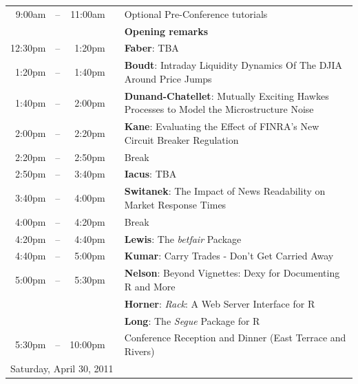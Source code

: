 \documentclass[11pt]{article}
\newcommand{\mylinecolor}[1]{\color{#1}\vspace{-8pt}}  %
\begin{document}
\begin{tabular}{rlrlp{5in}}
  9:00am & -- & 11:00am &   & \small{\mylinecolor{Breaks} Optional Pre-Conference tutorials} \\
  \phantom{X 12:00am}  & \phantom{m} &  & & \textbf{\color{Breaks} Opening remarks} \\
  12:30pm& -- & 1:20pm &    & \textbf{\color{KeynoteTalk} Faber}: \small{TBA} \\
  1:20pm & -- & 1:40pm &    & \textbf{\color{Talk} Boudt}: \small{Intraday Liquidity Dynamics Of The DJIA Around Price Jumps} \\
  1:40pm & -- & 2:00pm &    & \textbf{\color{Talk} Dunand-Chatellet}: \small{Mutually Exciting Hawkes Processes to Model the Microstructure Noise} \\[0pt]
  2:00pm & -- & 2:20pm &    & \textbf{\color{Talk} Kane}: \small{Evaluating the Effect of FINRA's New Circuit Breaker Regulation} \\[0pt]
  2:20pm & -- & 2:50pm &    & \small{\mylinecolor{Breaks} Break} \\
  2:50pm & -- & 3:40pm &    & \textbf{\color{KeynoteTalk} Iacus}: \small{TBA} \\
  3:40pm & -- & 4:00pm &    & \textbf{\color{Talk} Switanek}: \small{The Impact of News Readability on Market Response Times} \\
  4:00pm & -- & 4:20pm &    & \small{\mylinecolor{Breaks} Break} \\
  4:20pm & -- & 4:40pm &    & \textbf{\color{Talk} Lewis}: \small{The \emph{betfair} Package} \\
  4:40pm & -- & 5:00pm &    & \textbf{\color{Talk} Kumar}: \small{Carry Trades - Don't Get Carried Away} \\
  5:00pm & -- & 5:30pm &    & \textbf{\color{LightningTalk} Nelson}: \small{Beyond Vignettes: Dexy for Documenting R and More} \\
         &    &        &    & \textbf{\color{LightningTalk} Horner}: \small{\emph{Rack}: A Web Server Interface for R} \\
         &    &        &    & \textbf{\color{LightningTalk} Long}: \small{The \emph{Segue} Package for R} \\
  5:30pm & -- & 10:00pm &    & \small{\mylinecolor{Breaks} Conference Reception and Dinner (East Terrace and Rivers)}  \\[18pt]

  \multicolumn{5}{l}{\large Saturday, April 30, 2011} \\


\end{tabular}
\end{document}
